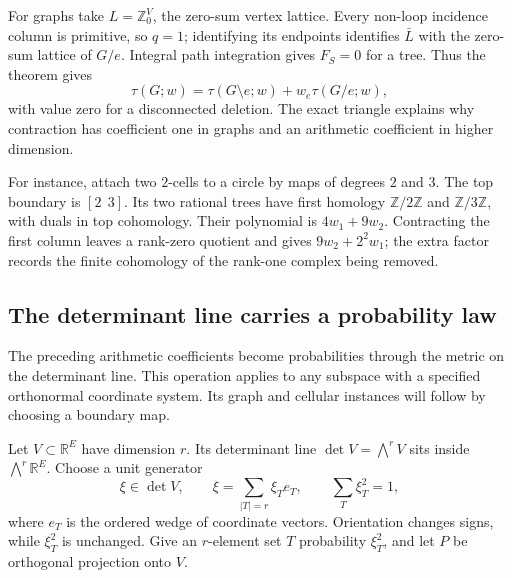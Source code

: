 \documentclass[11pt]{article}
\theoremstyle{definition}
\theoremstyle{remark}
\newcommand{\Z}{\mathbb Z}
\newcommand{\R}{\mathbb R}
\begin{document}
For graphs take \(L=\Z^V_0\), the zero-sum vertex lattice. Every
non-loop incidence column is primitive, so \(q=1\); identifying its
endpoints identifies \(\bar L\) with the zero-sum lattice of \(G/e\).
Integral path integration gives \(F_S=0\) for a tree. Thus the theorem
gives
\[
 \tau(G;w)=\tau(G\setminus e;w)+w_e\tau(G/e;w),
\]
with value zero for a disconnected deletion. The exact triangle
explains why contraction has coefficient one in graphs and an
arithmetic coefficient in higher dimension.

For instance, attach two \(2\)-cells to a circle by maps of degrees
\(2\) and \(3\). The top boundary is \([2\ \ 3]\). Its two rational
trees have first homology \(\Z/2\Z\) and \(\Z/3\Z\), with duals in
top cohomology. Their polynomial is \(4w_1+9w_2\). Contracting the
first column leaves a rank-zero quotient and gives
\(9w_2+2^2w_1\); the extra factor records the finite cohomology of
the rank-one complex being removed.

\subsection{The determinant line carries a probability law}
\label{sec:derived-exterior-probability}

The preceding arithmetic coefficients become probabilities through the metric on the determinant line. This operation applies to any subspace with a specified orthonormal coordinate system. Its graph and cellular instances will follow by choosing a boundary map.

Let $V\subset\R^E$ have dimension $r$. Its determinant line $\det V=\bigwedge^rV$ sits inside $\bigwedge^r\R^E$. Choose a unit generator
\[
 \xi\in\det V,\qquad
 \xi=\sum_{|T|=r}\xi_T e_T,
 \qquad\sum_T\xi_T^2=1,
\]
where $e_T$ is the ordered wedge of coordinate vectors. Orientation changes signs, while $\xi_T^2$ is unchanged. Give an $r$-element set $T$ probability $\xi_T^2$, and let $P$ be orthogonal projection onto $V$.
\end{document}
